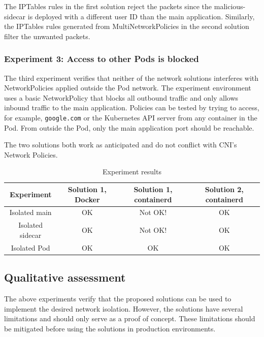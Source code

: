 \documentclass[english, 12pt, a4paper, sci, utf8, a-2b, online]{aaltothesis}
\begin{document}
The IPTables rules in the first solution reject the packets since the malicious-sidecar is deployed with a different user ID than the main application.
Similarly, the IPTables rules generated from MultiNetworkPolicies in the second solution filter the unwanted packets.

\subsubsection{Experiment 3: Access to other Pods is blocked}

The third experiment verifies that neither of the network solutions interferes with NetworkPolicies applied outside the Pod network.
The experiment environment uses a basic NetworkPolicy that blocks all outbound traffic and only allows inbound traffic to the main application.
Policies can be tested by trying to access, for example, \lstinline{google.com} or the Kubernetes API server from any container in the Pod.
From outside the Pod, only the main application port should be reachable.

The two solutions both work as anticipated and do not conflict with CNI's Network Policies.

\begin{table}[H]
  \sffamily
  \centering
  \caption{Experiment results}
  \label{table:evaluation-results}

  \begin{minipage}{\textwidth}
  \renewcommand{\thempfootnote}{\arabic{mpfootnote}}
  \begin{tabularx}{\textwidth}{CCCC}
    \textbf{Experiment} & \textbf{Solution 1, Docker} & \textbf{Solution 1, containerd} & \textbf{Solution 2, containerd} \\ \hline
    Isolated main & OK & Not OK! & OK \\ \hline
    Isolated sidecar & OK & Not OK! & OK \\ \hline
    Isolated Pod & OK & OK & OK \\ \hline
  \end{tabularx}
  \end{minipage}
\end{table}

\subsection{Qualitative assessment}

The above experiments verify that the proposed solutions can be used to implement the desired network isolation.
However, the solutions have several limitations and should only serve as a proof of concept.
These limitations should be mitigated before using the solutions in production environments.
\end{document}
